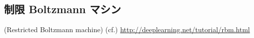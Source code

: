 \subsection{制限 Boltzmann マシン}(Restricted Boltzmann machine) 
(cf.) \url{http://deeplearning.net/tutorial/rbm.html}
